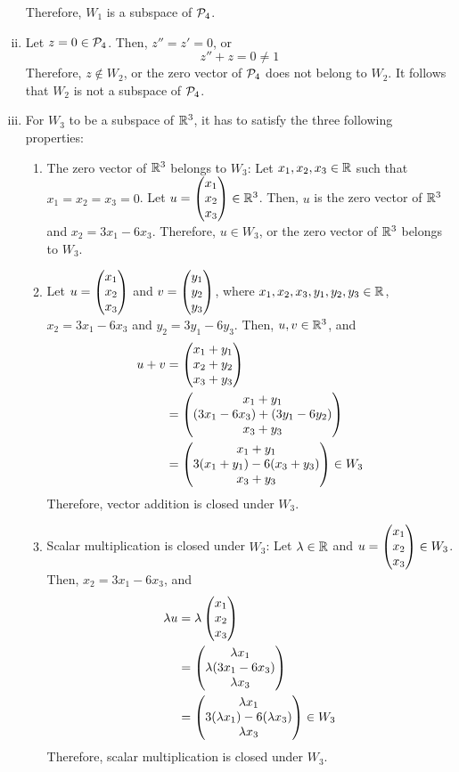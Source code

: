 \begin{sol}
\begin{enumerate}[(i)]
\begin{enumerate}[(1)]
        \end{enumerate}
        Therefore, $W_1$ is a subspace of $\P_4$.
        \item Let $z=0\in\P_4$. Then, $z''=z'=0$, or
        \[
            z''+z=0\not=1
        \]
        Therefore, $z\not\in W_2$, or the zero vector of $\P_4$ does not belong to $W_2$. It follows that $W_2$ is not a subspace of $\P_4$.
        \item For $W_3$ to be a subspace of $\R^{3}$, it has to satisfy the three following properties:
        \begin{enumerate}[(1)]
            \item The zero vector of $\R^{3}$ belongs to $W_3$: Let $x_1,x_2,x_3\in\R$ such that $x_1=x_2=x_3=0$. Let $u=\colvecthree{x_1}{x_2}{x_3}\in\R^{3}$. Then, $u$ is the zero vector of $\R^{3}$ and $x_2=3x_1-6x_3$. Therefore, $u\in W_3$, or the zero vector of $\R^{3}$ belongs to $W_3$.
            \item Let $u=\colvecthree{x_1}{x_2}{x_3}$ and $v=\colvecthree{y_1}{y_2}{y_3}$, where $x_1,x_2,x_3,y_1,y_2,y_3\in\R$, $x_2=3x_1-6x_3$ and $y_2=3y_1-6y_3$. Then, $u,v\in\R^{3}$, and
            \[
                \begin{aligned}
                    u+v & = \colvecthree{x_1+y_1}{x_2+y_2}{x_3+y_3}                      \\
                        & = \colvecthree{x_1+y_1}{(3x_1-6x_3)+(3y_1-6y_2)}{x_3+y_3}       \\
                        & = \colvecthree{x_1+y_1}{3(x_1+y_1)-6(x_3+y_3)}{x_3+y_3}\in W_3
                \end{aligned}
            \]
            Therefore, vector addition is closed under $W_3$.
            \item Scalar multiplication is closed under $W_3$: Let $\lam\in\R$ and $u=\colvecthree{x_1}{x_2}{x_3}\in W_3$. Then, $x_2=3x_1-6x_3$, and
            \[
                \begin{aligned}
                    \lam u & = \lam\colvecthree{x_1}{x_2}{x_3}                                  \\
                            & = \colvecthree{\lam x_1}{\lam (3x_1-6x_3)}{\lam x_3}               \\
                            & = \colvecthree{\lam x_1}{3(\lam x_1)-6(\lam x_3)}{\lam x_3}\in W_3
                \end{aligned}
            \]
            Therefore, scalar multiplication is closed under $W_3$.
        \end{enumerate}

\end{enumerate}
\end{sol}
